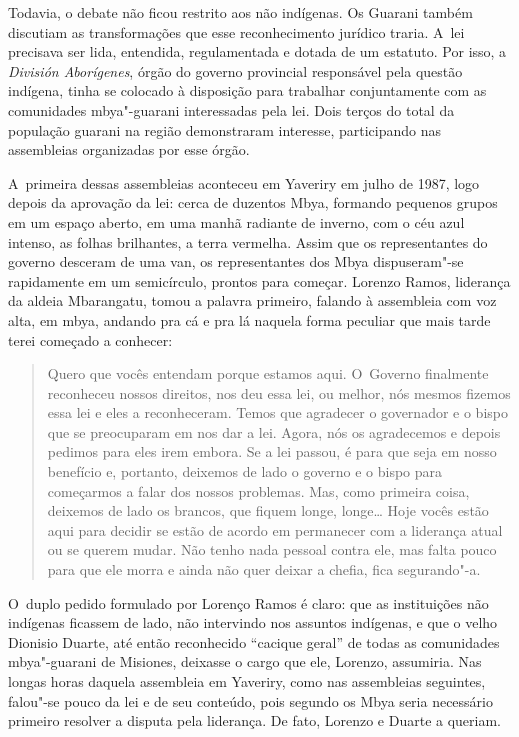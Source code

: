Todavia, o debate não ficou restrito aos não indígenas. Os Guarani
também discutiam as transformações que esse reconhecimento jurídico
traria. A~lei precisava ser lida, entendida, regulamentada e dotada de
um estatuto. Por isso, a \emph{División Aborígenes}, órgão do governo
provincial responsável pela questão indígena, tinha se colocado à
disposição para trabalhar conjuntamente com as comunidades mbya"-guarani
interessadas pela lei. Dois terços do total da população guarani na
região demonstraram interesse, participando nas assembleias organizadas
por esse órgão. 

A~primeira dessas assembleias aconteceu em Yaveriry em julho de 1987,
logo depois da aprovação da lei: cerca de duzentos Mbya, formando
pequenos grupos em um espaço aberto, em uma manhã radiante de inverno,
com o céu azul intenso, as folhas brilhantes, a terra vermelha. Assim
que os representantes do governo desceram de uma van, os representantes
dos Mbya dispuseram"-se rapidamente em um semicírculo, prontos para
começar. Lorenzo Ramos, liderança da aldeia Mbarangatu, tomou a palavra
primeiro, falando à assembleia com voz alta, em mbya, andando pra cá e
pra lá naquela forma peculiar que mais tarde terei começado a conhecer:

\begin{quote}
Quero que vocês entendam porque estamos aqui. O~Governo finalmente
reconheceu nossos direitos, nos deu essa lei, ou melhor, nós mesmos
fizemos essa lei e eles a reconheceram. Temos que agradecer o
governador e o bispo que se preocuparam em nos dar a lei. Agora, nós os
agradecemos e depois pedimos para eles irem embora. Se a lei passou, é
para que seja em nosso benefício e, portanto, deixemos de lado o
governo e o bispo para começarmos a falar dos nossos problemas. Mas,
como primeira coisa, deixemos de lado os brancos, que fiquem longe,
longe\ldots{} Hoje vocês estão aqui para decidir se estão de acordo em
permanecer com a liderança atual ou se querem mudar. Não tenho nada
pessoal contra ele, mas falta pouco para que ele morra e ainda não quer
deixar a chefia, fica segurando"-a.
\end{quote}

O~duplo pedido formulado por Lorenço Ramos é claro: que as instituições
não indígenas ficassem de lado, não intervindo nos assuntos indígenas,
e que o velho Dionisio Duarte, até então reconhecido ``cacique geral'' de
todas as comunidades mbya"-guarani de Misiones, deixasse o cargo que
ele, Lorenzo, assumiria. Nas longas horas daquela assembleia em
Yaveriry, como nas assembleias seguintes, falou"-se pouco da lei e de
seu conteúdo, pois segundo os Mbya seria necessário primeiro resolver a
disputa pela liderança. De fato, Lorenzo e Duarte a queriam.

